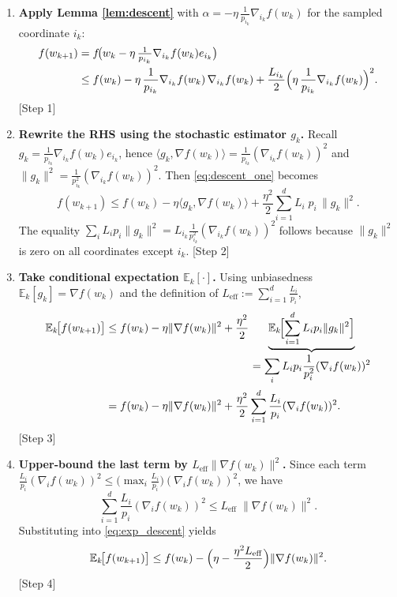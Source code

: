 \documentclass{article}
\begin{document}
\begin{enumerate}
    \item[Step 1.] \textbf{Apply Lemma \ref{lem:descent}} with $\alpha=-\eta\,\frac{1}{p_{i_k}}\nabla_{i_k}f(w_k)$ for the sampled coordinate $i_k$:
    \begin{align}
        f(w_{k+1}) 
        &= f\!\bigl(w_k-\eta\,\tfrac{1}{p_{i_k}}\nabla_{i_k}f(w_k)e_{i_k}\bigr) \nonumber\\
        &\le f(w_k) -\eta\,\frac{1}{p_{i_k}}\nabla_{i_k}f(w_k)\,\nabla_{i_k}f(w_k)
           +\frac{L_{i_k}}{2}\Bigl(\eta\,\frac{1}{p_{i_k}}\nabla_{i_k}f(w_k)\Bigr)^2 . \label{eq:descent_one}
    \end{align}
    [Step 1]

    \item[Step 2.] \textbf{Rewrite the RHS using the stochastic estimator $g_k$.}
    Recall $g_k=\frac{1}{p_{i_k}}\nabla_{i_k}f(w_k)e_{i_k}$, hence $\langle g_k,\nabla f(w_k)\rangle=\frac{1}{p_{i_k}}(\nabla_{i_k}f(w_k))^2$ and $\|g_k\|^2=\frac{1}{p_{i_k}^2}(\nabla_{i_k}f(w_k))^2$.  
    Then \eqref{eq:descent_one} becomes
    \begin{equation}
        f(w_{k+1}) \le f(w_k) -\eta\langle g_k,\nabla f(w_k)\rangle
        +\frac{\eta^2}{2}\sum_{i=1}^{d} L_i\;p_i\,\|g_k\|^2 . \label{eq:descent_two}
    \end{equation}
    The equality $\sum_i L_i p_i\|g_k\|^2 = L_{i_k}\frac{1}{p_{i_k}^2}(\nabla_{i_k}f(w_k))^2$ follows because $\|g_k\|^2$ is zero on all coordinates except $i_k$. \hfill[Step 2]

    \item[Step 3.] \textbf{Take conditional expectation $\mathbb{E}_k[\cdot]$.}
    Using unbiasedness $\mathbb{E}_k[g_k]=\nabla f(w_k)$ and the definition of $L_{\text{eff}}:=\sum_{i=1}^{d}\frac{L_i}{p_i}$,
    \begin{align}
        \mathbb{E}_k\!\bigl[f(w_{k+1})\bigr]
        &\le f(w_k) -\eta \|\nabla f(w_k)\|^2
           +\frac{\eta^2}{2}\,\underbrace{\mathbb{E}_k\!\Bigl[\sum_{i=1}^{d} L_i p_i \|g_k\|^2\Bigr]}_{\displaystyle =\sum_i L_i p_i \frac{1}{p_i^2}(\nabla_i f(w_k))^2 } \nonumber\\
        &= f(w_k) -\eta \|\nabla f(w_k)\|^2
           +\frac{\eta^2}{2}\sum_{i=1}^{d}\frac{L_i}{p_i}(\nabla_i f(w_k))^2 . \label{eq:exp_descent}
    \end{align}
    \hfill[Step 3]

    \item[Step 4.] \textbf{Upper‑bound the last term by $L_{\text{eff}}\|\nabla f(w_k)\|^2$.}
    Since each term $\frac{L_i}{p_i}(\nabla_i f(w_k))^2\le \bigl(\max_i\frac{L_i}{p_i}\bigr)(\nabla_i f(w_k))^2$, we have
    \[
        \sum_{i=1}^{d}\frac{L_i}{p_i}(\nabla_i f(w_k))^2 \le L_{\text{eff}}\;\|\nabla f(w_k)\|^2 .
    \]
    Substituting into \eqref{eq:exp_descent} yields
    \begin{equation}
        \mathbb{E}_k\!\bigl[f(w_{k+1})\bigr]
        \le f(w_k) -\Bigl(\eta-\frac{\eta^2 L_{\text{eff}}}{2}\Bigr)\|\nabla f(w_k)\|^2 . \label{eq:descent_final}
    \end{equation}
    \hfill[Step 4]


\end{enumerate}
\end{document}

